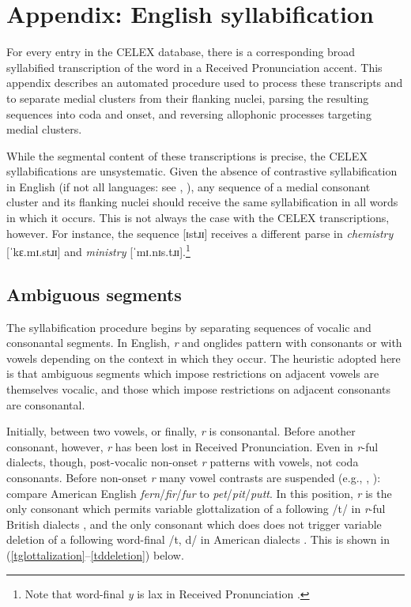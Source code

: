 \documentclass[12pt]{article}
\begin{document}
\section{Appendix: English syllabification}
\label{syllabification}

For every entry in the CELEX database, there is a corresponding broad syllabified transcription of the word in a Received Pronunciation accent. This appendix describes an automated procedure used to process these transcripts and to separate medial clusters from their flanking nuclei, parsing the resulting sequences into coda and onset, and reversing allophonic processes targeting medial clusters.

While the segmental content of these transcriptions is precise, the CELEX syllabifications are unsystematic. Given the absence of contrastive syllabification in English (if not all languages: see \citealp[221]{Blevins1995}, \citealp{Elfner2006}), any sequence of a medial consonant cluster and its flanking nuclei should receive the same syllabification in all words in which it occurs. This is not always the case with the CELEX transcriptions, however. For instance, the sequence [ɪstɹɪ] receives a different parse in \emph{chemistry} [ˈkɛ.mɪ.stɹɪ] and \emph{ministry} [ˈmɪ.nɪs.tɹɪ].\footnote{Note that word-final \emph{y} is lax in Received Pronunciation \citep[][II.294]{AOE}.}

\subsection{Ambiguous segments}

The syllabification procedure begins by separating sequences of vocalic and consonantal segments. In English, \emph{r} and onglides pattern with consonants or with vowels depending on the context in which they occur. The heuristic adopted here is that ambiguous segments which impose restrictions on adjacent vowels are themselves vocalic, and those which impose restrictions on adjacent consonants are consonantal.

Initially, between two vowels, or finally, \emph{r} is consonantal. Before another consonant, however, \emph{r} has been lost in Received Pronunciation. Even in \emph{r}-ful dialects, though, post-vocalic non-onset \emph{r} patterns with vowels, not coda consonants. Before non-onset \emph{r} many vowel contrasts are suspended (e.g., \citealp[269f.]{Fudge1969}, \citealp[][255]{Harris1994}): compare American English \emph{fern}/\emph{fir}/\emph{fur} to \emph{pet}/\emph{pit}/\emph{putt}. In this position, \emph{r} is the only consonant which permits variable glottalization of a following /t/ in \emph{r}-ful British dialects \citep[258]{Harris1994}, and the only consonant which does does not trigger variable deletion of a following word-final /t, d/ in American dialects \citep[8]{Guy1980}. This is shown in (\ref{tglottalization}--\ref{tddeletion}) below.
\end{document}
